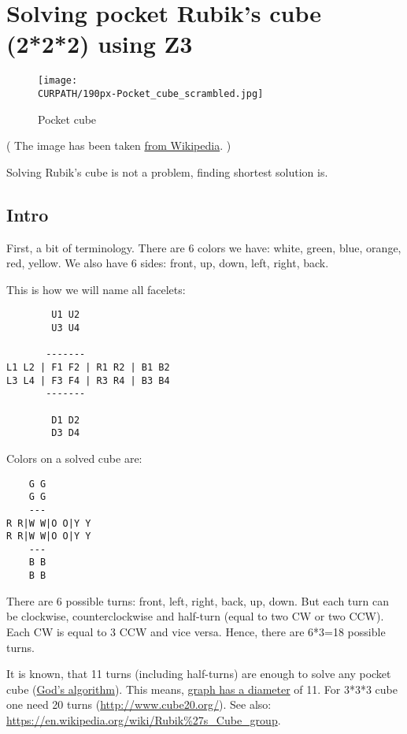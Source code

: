 \section{Solving pocket Rubik’s cube (2*2*2) using Z3}
\label{PocketCubeSMT}

\renewcommand{\CURPATH}{puzzles/rubik2/failed_SMT}

\begin{figure}[H]
\centering
\texttt{[image: \\CURPATH/190px-Pocket\_cube\_scrambled.jpg]}
\caption{Pocket cube}
\end{figure}

( The image has been taken \href{https://en.wikipedia.org/wiki/Pocket_Cube}{from Wikipedia}. )

Solving Rubik's cube is not a problem, finding shortest solution is.

\subsection{Intro}

First, a bit of terminology.
There are 6 colors we have: white, green, blue, orange, red, yellow.
We also have 6 sides: front, up, down, left, right, back.

This is how we will name all facelets:

\begin{lstlisting}
        U1 U2
        U3 U4

       -------
L1 L2 | F1 F2 | R1 R2 | B1 B2
L3 L4 | F3 F4 | R3 R4 | B3 B4
       -------

        D1 D2
        D3 D4
\end{lstlisting}

Colors on a solved cube are:

\begin{lstlisting}
    G G
    G G
    ---
R R|W W|O O|Y Y
R R|W W|O O|Y Y
    ---
    B B
    B B
\end{lstlisting}

There are 6 possible turns: front, left, right, back, up, down.
But each turn can be clockwise, counterclockwise and half-turn (equal to two CW or two CCW).
Each CW is equal to 3 CCW and vice versa.
Hence, there are 6*3=18 possible turns.

It is known, that 11 turns (including half-turns) are enough to solve any pocket cube
(\href{https://en.wikipedia.org/wiki/Optimal_solutions_for_Rubik%27s_Cube}{God’s algorithm}).
This means, \href{http://mathworld.wolfram.com/GraphDiameter.html}{graph has a diameter} of 11.
For 3*3*3 cube one need 20 turns (\url{http://www.cube20.org/}).
See also: \url{https://en.wikipedia.org/wiki/Rubik%27s_Cube_group}.

